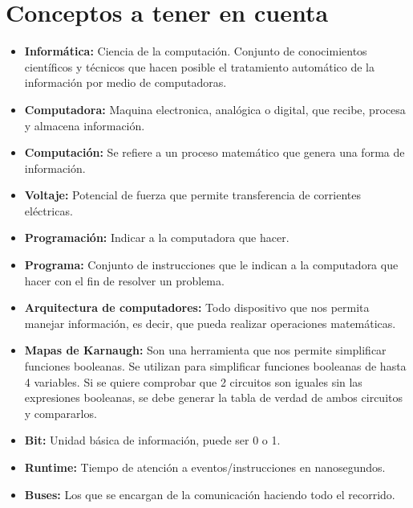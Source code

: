 \documentclass{templateNote}
\begin{document}


\portada
\margenes 
\tableofcontents
\newpage

\section{Conceptos a tener en cuenta}
\begin{itemize}
    \item \textbf{Informática:} Ciencia de la computación. Conjunto de conocimientos científicos y técnicos que hacen posible el tratamiento automático de la información por medio de computadoras.
    \item \textbf{Computadora:} Maquina electronica, analógica o digital, que recibe, procesa y almacena información.
    \item \textbf{Computación:} Se refiere a un proceso matemático que genera una forma de información. 
    \item \textbf{Voltaje:} Potencial de fuerza que permite transferencia de corrientes eléctricas.
    \item \textbf{Programación:} Indicar a la computadora que hacer.
    \item \textbf{Programa:} Conjunto de instrucciones que le indican a la computadora que hacer con el fin de resolver un problema.
    \item \textbf{Arquitectura de computadores:} Todo dispositivo que nos permita manejar información, es decir, que pueda realizar operaciones matemáticas.
    \item \textbf{Mapas de Karnaugh:} Son una herramienta que nos permite simplificar funciones booleanas. Se utilizan para simplificar funciones booleanas de hasta 4 variables. Si se quiere comprobar que 2 circuitos son iguales sin las expresiones booleanas, se debe generar la tabla de verdad de ambos circuitos y compararlos.
    \item \textbf{Bit:} Unidad básica de información, puede ser 0 o 1.
    \item \textbf{Runtime:} Tiempo de atención a eventos/instrucciones en nanosegundos.
    \item \textbf{Buses:} Los que se encargan de la comunicación haciendo todo el recorrido. 
\end{itemize}
\newpage
\end{document}
